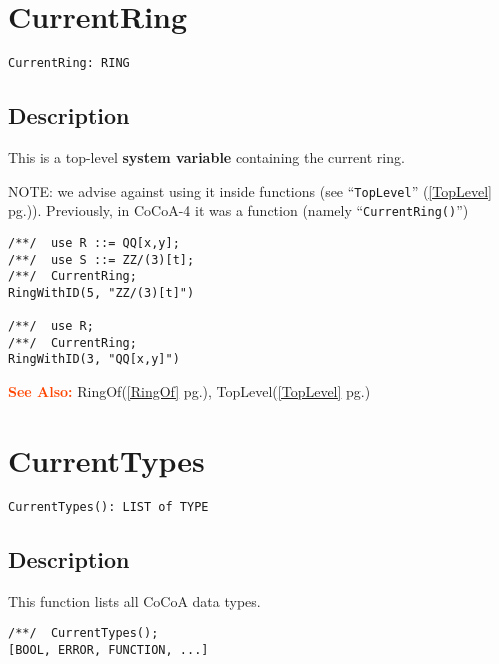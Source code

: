 \documentclass[a4paper]{mybook}
\newenvironment{command}{}{} %
\newcommand\SeeAlso{\par\textcolor{OrangeRed}{\textbf{\large See Also: }}}
\begin{document}
\section{CurrentRing}
\label{CurrentRing}
\begin{command} %


\begin{Verbatim}[label=syntax, rulecolor=\color{MidnightBlue},
frame=single]
CurrentRing: RING
\end{Verbatim}


\subsection*{Description}

This is a top-level \textbf{system variable} containing the current ring.
\par 
NOTE: we advise against using it inside functions (see ``\verb&TopLevel&'' (\ref{TopLevel} pg.\pageref{TopLevel})).
Previously, in CoCoA-4 it was a function (namely ``\verb&CurrentRing()&'')
\begin{Verbatim}[label=example, rulecolor=\color{PineGreen}, frame=single]
/**/  use R ::= QQ[x,y];
/**/  use S ::= ZZ/(3)[t];
/**/  CurrentRing;
RingWithID(5, "ZZ/(3)[t]")

/**/  use R;
/**/  CurrentRing;
RingWithID(3, "QQ[x,y]")
\end{Verbatim}


\SeeAlso %
  RingOf(\ref{RingOf} pg.\pageref{RingOf}), 
    TopLevel(\ref{TopLevel} pg.\pageref{TopLevel})
\end{command} %

\section{CurrentTypes}
\label{CurrentTypes}
\begin{command} %


\begin{Verbatim}[label=syntax, rulecolor=\color{MidnightBlue},
frame=single]
CurrentTypes(): LIST of TYPE
\end{Verbatim}


\subsection*{Description}

This function lists all CoCoA data types.
\begin{Verbatim}[label=example, rulecolor=\color{PineGreen}, frame=single]
/**/  CurrentTypes();
[BOOL, ERROR, FUNCTION, ...]
\end{Verbatim}


\end{command} %
\end{document}
